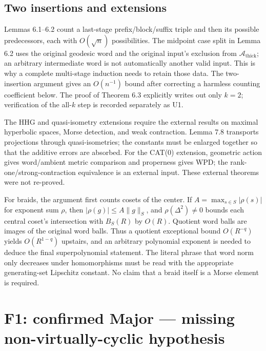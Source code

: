 \documentclass[10pt]{article}
\begin{document}
\subsection*{Two insertions and extensions}
Lemmas 6.1–6.2 count a last-stage prefix/block/suffix triple and then its possible predecessors, each with \(O(\sqrt n)\) possibilities. The midpoint case split in Lemma 6.2 uses the original geodesic word and the original input’s exclusion from \(\mathcal A_{\mathrm{thick}}\); an arbitrary intermediate word is not automatically another valid input. This is why a complete multi-stage induction needs to retain those data. The two-insertion argument gives an \(O(n^{-1})\) bound after correcting a harmless counting coefficient below. The proof of Theorem 6.3 explicitly writes out only \(k=2\); verification of the all-\(k\) step is recorded separately as U1.\par
The HHG and quasi-isometry extensions require the external results on maximal hyperbolic spaces, Morse detection, and weak contraction. Lemma 7.8 transports projections through quasi-isometries; the constants must be enlarged together so that the additive errors are absorbed. For the CAT(0) extension, geometric action gives word/ambient metric comparison and properness gives WPD; the rank-one/strong-contraction equivalence is an external input. These external theorems were not re-proved.\par
For braids, the argument first counts cosets of the center. If \(A=\max_{s\in S}|\rho(s)|\) for exponent sum \(\rho\), then \(|\rho(g)|\le A\|g\|_S\), and \(\rho(\Delta^2)\ne0\) bounds each central coset’s intersection with \(B_S(R)\) by \(O(R)\). Quotient word balls are images of the original word balls. Thus a quotient exceptional bound \(O(R^{-q})\) yields \(O(R^{1-q})\) upstairs, and an arbitrary polynomial exponent is needed to deduce the final superpolynomial statement. The literal phrase that word norm only decreases under homomorphisms must be read with the appropriate generating-set Lipschitz constant. No claim that a braid itself is a Morse element is required.\par
\section*{F1: confirmed Major — missing non-virtually-cyclic hypothesis}
\end{document}
